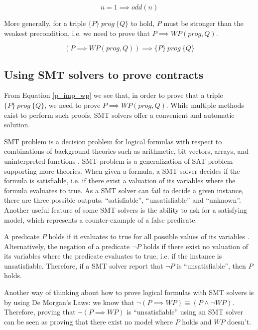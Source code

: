 \documentclass{kththesis}
\newcommand{\htriple}[3]{\ensuremath{\{#1\}~#2~\{#3\}}}
\newcommand{\WP}{\ensuremath{\mathit{WP}}}
\begin{document}
\begin{equation}
  n=1 \implies odd(n)
\end{equation}

More generally, for a triple \htriple{P}{prog}{Q} to hold, $P$ must be stronger than the weakest precondition, i.e. we need to prove that $P \implies \WP(prog, Q)$.


\begin{equation}
  (P \implies \WP(prog, Q)) \implies \htriple{P}{prog}{Q}
  \label{p_imp_wp}
\end{equation}

\subsection{Using SMT solvers to prove contracts} \label{using-smt-to-prove-contracts}

From Equation \ref{p_imp_wp} we see that, in order to prove that a triple \htriple{P}{prog}{Q}, we need to prove $P \implies \WP(prog, Q)$. While multiple methods exist to perform such proofs, \acrshort{SMT} solvers offer a convenient and automatic solution.

\acrfull{SMT} problem is a decision problem for logical formulas with respect to combinations of background theories such as arithmetic, bit-vectors, arrays, and uninterpreted functions \cite{nikolaj_bjorner_programming_2019}. \gls{SMT} problem is a generalization of \gls{SAT} problem supporting more theories. When given a formula, a \gls{SMT} solver decides if the formula is satisfiable, i.e. if there exist a valuation of its variables where the formula evaluates to true. As a \gls{SMT} solver can fail to decide a given instance, there are three possible outputs: ``satisfiable'', ``unsatisfiable'' and ``unknown''. Another useful feature of some \gls{SMT} solvers is the ability to ask for a satisfying model, which represents a counter-example of a false predicate.

A predicate $P$ holds if it evaluates to true for all possible values of its variables . Alternatively, the negation of a predicate $\neg P$ holds if there exist no valuation of its variables where the predicate evaluates to true, i.e. if the instance is unsatisfiable. Therefore, if a \gls{SMT} solver report that $\neg P$ is ``unsatisfiable'', then $P$ holds.

Another way of thinking about how to prove logical formulas with \gls{SMT} solvers is by using De Morgan's Laws: we know that $\neg (P \implies \WP) \equiv (P \land \neg \WP)$. Therefore, proving that $\neg (P \implies \WP)$ is ``unsatisfiable'' using an \gls{SMT} solver can be seen as proving that there exist no model where $P$ holds and $\WP$ doesn't.
\end{document}
